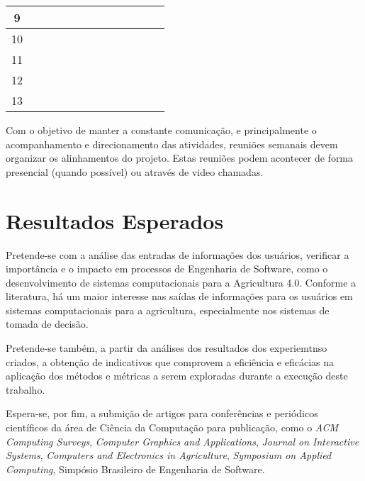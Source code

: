\documentclass[12pt]{article}
\begin{document}
\begin{table}[htbp]
\begin{tabular}{|c|p{0.6cm}|p{0.6cm}|p{0.6cm}|p{0.6cm}|p{0.6cm}|p{0.6cm}|p{0.6cm}|p{0.6cm}|p{0.6cm}|p{0.6cm}|p{0.6cm}|p{0.6cm}|}
    \multicolumn{ 1}{|c|}{9}              &         &         &         &         &         &         &         &         &\cellcolor{black}&         &         &            \\
		\hline
    \multicolumn{ 1}{|c|}{10}              &         &         &         &         &         &         &         &         &         &\cellcolor{black}&         &            \\
		\hline
    \multicolumn{ 1}{|c|}{11}              &         &         &         &         &         &\cellcolor{black}&\cellcolor{black}&\cellcolor{black}&\cellcolor{black}&\cellcolor{black}&\cellcolor{black}&\cellcolor{black}            \\
		\hline
    \multicolumn{ 1}{|c|}{12}              &         &         &         &         &         &	&		&	&\cellcolor{black}&\cellcolor{black}&\cellcolor{black}&\cellcolor{black}        \\
		\hline
    \multicolumn{ 1}{|c|}{13}              &         &         &         &         &         &         &         &         &         &         &			&\cellcolor{black}            \\
		\hline
	\end{tabular}  
	\label{tab:cronograma}%
\end{table}

Com o objetivo de manter a constante comunicação, e principalmente o acompanhamento e direcionamento das atividades, reuniões semanais devem organizar os alinhamentos do projeto. Estas reuniões podem acontecer de forma presencial (quando possível) ou através de video chamadas.

\section{Resultados Esperados}

Pretende-se com a análise das entradas de informações dos usuários, verificar a importância e o impacto em processos de Engenharia de Software, como o desenvolvimento de sistemas computacionais para a Agricultura 4.0. Conforme a literatura, há um maior interesse nas saídas de informações para os usuários em sistemas computacionais para a agricultura, especialmente nos sistemas de tomada de decisão.

Pretende-se também, a partir da análises dos resultados dos experiemtnso criados, a obtenção de indicativos que comprovem a eficiência e eficácias na aplicação dos métodos e métricas a serem exploradas durante a execução deste trabalho.

Espera-se, por fim, a submição de artigos para conferências e periódicos científicos da área de Ciência da Computação para publicação, como o \textit{ACM Computing Surveys}, \textit{Computer Graphics and Applications}, \textit{Journal on Interactive Systems}, \textit{Computers and Electronics in Agriculture}, \textit{Symposium on Applied Computing}, Simpósio Brasileiro de Engenharia de Software. 



\end{document}
